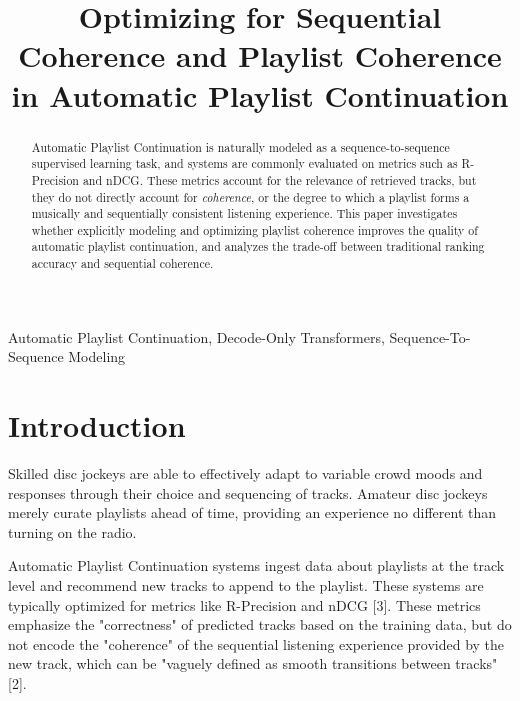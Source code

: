 \documentclass[conference]{IEEEtran}
\begin{document}
\title{Optimizing for Sequential Coherence and Playlist Coherence in Automatic Playlist Continuation}

\author{
}
\maketitle

\begin{abstract}
Automatic Playlist Continuation is naturally modeled as a sequence-to-sequence supervised learning task, and systems are commonly evaluated on metrics such as R-Precision and nDCG. These metrics account for the relevance of retrieved tracks, but they do not directly account for \textit{coherence}, or the degree to which a playlist forms a musically and sequentially consistent listening experience. This paper investigates whether explicitly modeling and optimizing playlist coherence improves the quality of automatic playlist continuation, and analyzes the trade-off between traditional ranking accuracy and sequential coherence.
\end{abstract}

\begin{IEEEkeywords}
Automatic Playlist Continuation, Decode-Only Transformers, Sequence-To-Sequence Modeling
\end{IEEEkeywords}

\section{Introduction}
Skilled disc jockeys are able to effectively adapt to variable crowd moods and responses through their choice and sequencing of tracks. Amateur disc jockeys merely curate playlists ahead of time, providing an experience no different than turning on the radio.

Automatic Playlist Continuation systems ingest data about playlists at the track level and recommend new tracks to append to the playlist. These systems are typically optimized for metrics like R-Precision and nDCG [3]. These metrics emphasize the "correctness" of predicted tracks based on the training data, but do not encode the "coherence" of the sequential listening experience provided by the new track, which can be "vaguely defined as smooth transitions between tracks" [2]. 
\end{document}

